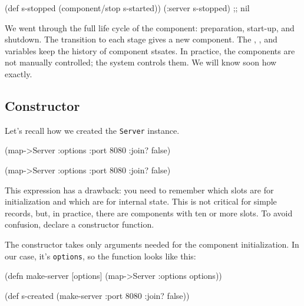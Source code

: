 \begin{english}
  \begin{clojure}
(def s-stopped (component/stop s-started))
(:server s-stopped) ;; nil
  \end{clojure}
\end{english}

\fi

We went through the full life cycle of the component: preparation, start-up, and shutdown. The transition to each stage gives a new component. The , , and  variables keep the history of component stsates. In practice, the components are not manually controlled; the system controls them. We will know soon how exactly.

\subsection{Constructor}


Let's recall how we created the \verb|Server| instance.

\ifnarrow

\begin{english}
  \begin{clojure}
(map->Server
  {:options {:port 8080
             :join? false}})
  \end{clojure}
\end{english}

\else

\begin{english}
  \begin{clojure}
(map->Server {:options {:port 8080 :join? false}})
  \end{clojure}
\end{english}

\fi


This expression has a drawback: you need to remember which slots are for initialization and which are for internal state. This is not critical for simple records, but, in practice, there are components with ten or more slots. To avoid confusion, declare a constructor function.

The constructor takes only arguments needed for the component initialization. In our case, it's \verb|options|, so the function looks like this:

\ifnarrow

\begin{english}
  \begin{clojure}
(defn make-server
  [options]
  (map->Server {:options options}))

(def s-created
  (make-server {:port 8080
                :join? false}))
  \end{clojure}
\end{english}

